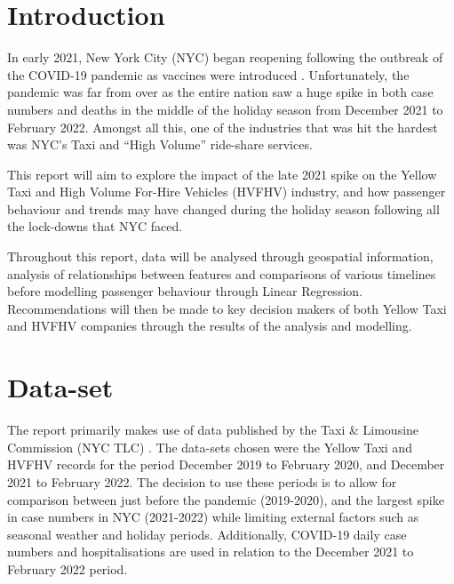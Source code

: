 \documentclass[11pt]{article}
\author{
Kelman Chen \\ 
Student ID: 1168867 \\
\href{https://github.com/MAST30034-Applied-Data-Science/mast30034-project-1-kelmanchen.git}{Github repo with commit}
}
\begin{document}
\maketitle

\section{Introduction}

In early 2021, New York City (NYC) began reopening following the outbreak of the COVID-19 pandemic as vaccines were introduced \cite{NYC_covid_timeline}.  Unfortunately, the pandemic was far from over as the entire nation saw a huge spike in both case numbers and deaths in the middle of the holiday season from December 2021 to February 2022. Amongst all this, one of the industries that was hit the hardest was NYC's Taxi and ``High Volume'' ride-share services.

This report will aim to explore the impact of the late 2021 spike on the Yellow Taxi and High Volume For-Hire Vehicles (HVFHV) industry, and how passenger behaviour and trends may have changed during the holiday season following all the lock-downs that NYC faced. 

Throughout this report, data will be analysed through geospatial information, analysis of relationships between features and comparisons of various timelines before modelling passenger behaviour through Linear Regression. Recommendations will then be made to key decision makers of both Yellow Taxi and HVFHV companies through the results of the analysis and modelling.

\section{Data-set}

The report primarily makes use of data published by the Taxi \& Limousine Commission (NYC TLC) \cite{TLC_data}. The data-sets chosen were the Yellow Taxi and HVFHV records for the period December 2019 to February 2020, and December 2021 to February 2022. The decision to use these periods is to allow for comparison between just before the pandemic (2019-2020), and the largest spike in case numbers in NYC (2021-2022) while limiting external factors such as seasonal weather and holiday periods. Additionally, COVID-19 daily case numbers and hospitalisations are used in relation to the December 2021 to February 2022 period. 
\end{document}
